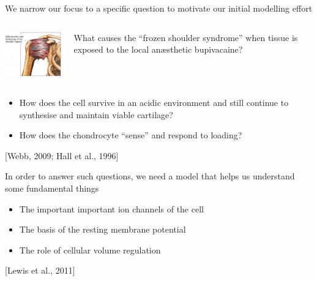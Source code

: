 \documentclass{beamer}
\newcommand{\references}[1] {
  \begin{flushright}
    \scriptsize [#1] \normalsize
  \end{flushright}
}
\begin{document}
\begin{frame}{We narrow our focus to a specific question to motivate
    our initial modelling effort}

  \begin{columns}
    \begin{column}{4.5cm}
      \begin{center}
        \includegraphics[width=4cm]{../images/pdf/frozen-shoulder}
      \end{center}
    \end{column}
    \begin{column}{6cm}
      What causes the ``frozen shoulder syndrome''
      when tissue is exposed to the local an\ae{}sthetic
      bupivacaine?
    \end{column}
  \end{columns}

  \vspace{0.5cm}
  \pause

  \begin{itemize}
  \item<2-> How does the cell survive in an acidic environment and
    still continue to synthesise and maintain viable cartilage?
  \item<2-> How does the chondrocyte ``sense'' and respond to loading?
  \end{itemize}

  \references{Webb, 2009; Hall et al., 1996}

\end{frame}

\begin{frame}{In order to answer such questions, we need a model that
    helps us understand some fundamental things}

  \begin{itemize}
  \item The important important ion channels of the cell\\[0.5cm]
  \item The basis of the resting membrane potential\\[0.5cm]
  \item The role of cellular volume regulation
  \end{itemize}

  \references{Lewis et al., 2011}

\end{frame}
\end{document}
